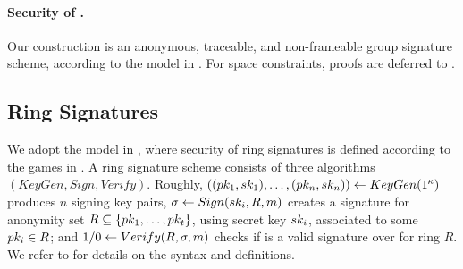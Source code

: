 \paragraph{Security of \CUASGS.} %
Our \CUASGS construction is an anonymous, traceable, and non-frameable group
signature scheme, according to the model in \cite{bsz05}. For space constraints,
proofs are deferred to .




\subsection{Ring Signatures}
\label{ssec:related-models-rs}

We adopt the model in \cite{bkm06}, where security of ring signatures is
defined according to the games in . A ring signature
scheme consists of three algorithms $(KeyGen,Sign,Verify)$. Roughly,
$((pk_1,sk_1),\dots,(pk_n,sk_n)) \gets KeyGen(1^\kappa)$ produces $n$
signing key pairs, $\sigma \gets Sign(sk_i,R,m)$ creates a signature for
anonymity set $R \subseteq \lbrace pk_1, \dots, pk_t \rbrace$, using secret
key $sk_i$, associated to some $pk_i \in R$; and $1/0 \gets Verify(R,\sigma,
m)$ checks if \sig is a valid signature over \msg for ring $R$. We refer
to \cite{bkm06} for details on the syntax and definitions.

